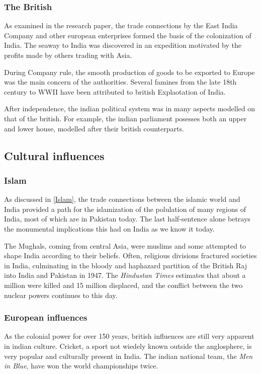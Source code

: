 \documentclass[11pt, a4paper, headings=standardclasses]{scrartcl}
\begin{document}
\subsubsection{The British}

As examined in the research paper, the trade connections by the East India Company and other european enterprises formed the basis of the colonization of India. The seaway to India was discovered in an expedition motivated by the profits made by others trading with Asia.

During Company rule, the smooth production of goods to be exported to Europe was the main concern of the authorities. Several famines from the late 18th century to WWII have been attributed to british Explaotation of India.\autocite{td}

After independence, the indian political system was in many aspects modelled on that of the british. For example, the indian parliament posesses both an upper and lower house, modelled after their british counterparts.

\subsection{Cultural influences}
\subsubsection{Islam}
As discussed in \ref{Islam}, the trade connections between the islamic world and India provided a path for the islamization of the polulation of many regions of India, most of which are in Pakistan today. The last half-sentence alone betrays the monumental implications this had on India as we know it today.

The Mughals, coming from central Asia, were muslims and some attempted to shape India according to their beliefs. Often, religious divisions fractured societies in India, culminating in the bloody and haphazard partition of the British Raj into India and Pakistan in 1947. The \textit{Hindustan Times} estimates that about a million were killed and 15 million displaced, and the conflict between the two nuclear powers continues to this day.\autocite[Chapter VI]{guha, partition}

\subsubsection{European influences}

As the colonial power for over 150 years, british influences are still very apparent in indian culture. Cricket, a sport not wiedely known outside the anglosphere, is very popular and culturally present in India.\autocite{cricket} The indian national team, the \textit{Men in Blue}, have won the world championships twice.\autocite{bbc}
\end{document}
